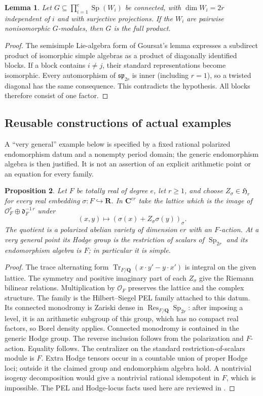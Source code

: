 \documentclass[11pt,reqno]{article}
\theoremstyle{emphasizedplain}
\theoremstyle{emphasizeddefinition}
\theoremstyle{emphasizeddefinition}
\newtheorem{prelemma}{Lemma}
\newtheorem{preproposition}[prelemma]{Proposition}
\DeclareMathOperator{\Sp}{Sp}
\DeclareMathOperator{\Res}{Res}
\DeclareMathOperator{\Tr}{Tr}
\newcommand{\Q}{\mathbf Q}
\newcommand{\C}{\mathbf C}
\newcommand{\R}{\mathbf R}
\begin{document}
\begin{prelemma}\label{p:goursat}
Let $G\subseteq\prod_{i=1}^e\Sp(W_i)$ be connected, with $\dim W_i=2r$
independent of $i$ and with surjective projections. If the $W_i$ are
pairwise nonisomorphic $G$-modules, then $G$ is the full product.
\end{prelemma}
\begin{proof}
The semisimple Lie-algebra form of Goursat's lemma expresses a subdirect
product of isomorphic simple algebras as a product of diagonally identified
blocks. If a block contains $i\ne j$, their standard representations become
isomorphic. Every automorphism of $\mathfrak{sp}_{2r}$ is inner (including
$r=1$), so a twisted diagonal has the same consequence. This contradicts
the hypothesis. All blocks therefore consist of one factor.
\end{proof}

\subsection*{Reusable constructions of actual examples}
A ``very general'' example below is specified by a fixed rational
polarized endomorphism datum and a nonempty period domain; the generic
endomorphism algebra is then justified. It is not an assertion of an
explicit arithmetic point or an equation for every family.

\begin{preproposition}\label{p:realconstruction}
Let $F$ be totally real of degree $e$, let $r\geq1$, and choose
$Z_\sigma\in\mathfrak H_r$ for every real embedding $\sigma:F\hookrightarrow\R$.
In $\C^{er}$ take the lattice which is the image of
$\mathcal O_F^r\oplus\mathfrak d_F^{-1\,r}$ under
\[
 (x,y)\longmapsto(\sigma(x)+Z_\sigma\sigma(y))_\sigma .
\]
The quotient is a polarized abelian variety of dimension $er$ with an
$F$-action. At a very general point its Hodge group is the restriction of
scalars of $\Sp_{2r}$ and its endomorphism algebra is $F$; in particular it
is simple.
\end{preproposition}
\begin{proof}
The trace alternating form
$\Tr_{F/\Q}(x\cdot y'-y\cdot x')$ is integral on the given lattice. The
symmetry and positive imaginary part of each $Z_\sigma$ give the Riemann
bilinear relations. Multiplication by $\mathcal O_F$ preserves the lattice
and the complex structure. The family is the Hilbert--Siegel PEL family
attached to this datum. Its connected monodromy is Zariski dense in
$\Res_{F/\Q}\Sp_{2r}$: after imposing a level, it is an arithmetic subgroup
of this group, which has no compact real factors, so Borel density applies.
Connected monodromy is contained in the generic Hodge group. The reverse
inclusion follows from the polarization and $F$-action. Equality follows.
The centralizer on the standard restriction-of-scalars module is $F$.
Extra Hodge tensors occur in a countable union of proper Hodge loci;
outside it the claimed group and endomorphism algebra hold. A nontrivial
isogeny decomposition would give a nontrivial rational idempotent in $F$,
which is impossible. The PEL and Hodge-locus facts used here are reviewed in
\cite{Moonen}.
\end{proof}
\end{document}
